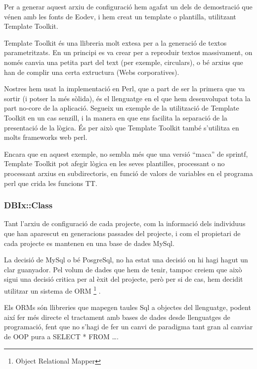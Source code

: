 Per a generar aquest arxiu de configuració hem agafat un dels de demostració que
vénen amb les fonts de Eodev, i hem creat un template o plantilla, utilitzant
Template Toolkit.

Template Toolkit és una llibreria molt extesa per a la generació de textos
parametritzats.  En un principi es va crear per a reproduir textos massivament,
on només canvia una petita part del text (per exemple, circulars), o bé arxius
que han de complir una certa extructura (Webs corporatives).

Nostres hem usat la implementació en Perl, que a part de ser la primera que va
sortir (i potser la més sòlida), és el llenguatge en el que hem desenvolupat
tota la part no-core de la aplicació.  Segueix un exemple de la utilització de
Template Toolkit en un cas senzill, i la manera en que ens facilita la separació
de la presentació de la lògica.  És per això que Template Toolkit també
s'utilitza en molts frameworks web perl.


Encara que en aquest exemple, no sembla més que una versió ``maca'' de sprintf,
Template Toolkit pot afegir lògica en les seves plantilles, processant o no
processant arxius en subdirectoris, en funció de valors de variables en el
programa perl que crida les funcions TT.


\subsubsection{DBIx::Class} %
\label{ssub:DBIx Class}

Tant l'arxiu de configuració de cada projecte, com la informació dels individuus
que han aparescut en generacions passades del projecte, i com el propietari de
cada projecte es mantenen en una base de dades MySql.

La decisió de MySql o bé PosgreSql, no ha estat una decisió on hi hagi hagut un
clar guanyador.  Pel volum de dades que hem de tenir, tampoc creiem que això
sigui una decisió critica per al èxit del projecte, però per si de cas, hem
decidit utilitzar un sistema de ORM \footnote{Object Relational Mapper} .

Els ORMs són llibreries que mapegen taules Sql a objectes del llenguatge, podent
així fer més directe el tractament amb bases de dades desde llenguatges de
programació, fent que no s'hagi de fer un canvi de paradigma tant gran al
canviar de OOP pura a SELECT * FROM \ldots  .

